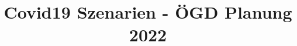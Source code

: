 \documentclass[11pt]{book}
\title{Covid19 Szenarien - ÖGD Planung 2022}
\author{}
\begin{document}
\maketitle
\def\title#1{\chapter{#1}}
\tableofcontents

        
        
        
        
        
        
        
        
\end{document}
